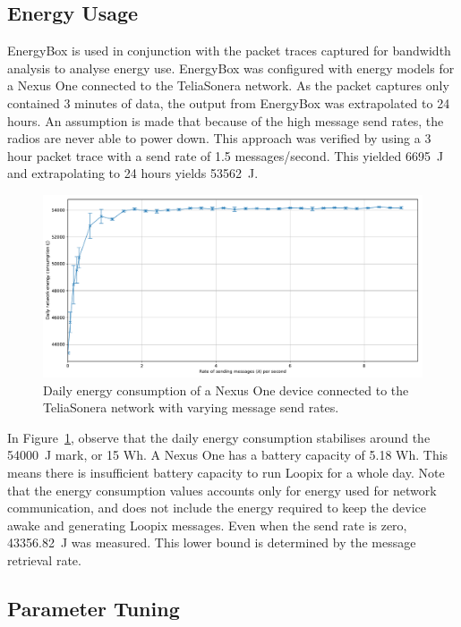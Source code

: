 \documentclass[final,dissertation.tex]{subfiles}
\begin{document}
\subsection{Energy Usage}

EnergyBox \cite{vergara2014energybox} is used in conjunction with the packet traces captured for bandwidth analysis to analyse energy use. EnergyBox was configured with energy models for a Nexus One connected to the TeliaSonera network. As the packet captures only contained 3 minutes of data, the output from EnergyBox was extrapolated to 24 hours. An assumption is made that because of the high message send rates, the radios are never able to power down. This approach was verified by using a 3 hour packet trace with a send rate of 1.5 messages/second. This yielded \SI{6695}{\joule} and extrapolating to 24 hours yields \SI{53562}{\joule}.

\begin{figure}[h]
	\includegraphics[width=\linewidth]{../figs/energy_use_2}
	\caption{Daily energy consumption of a Nexus One device connected to the TeliaSonera network with varying message send rates.}
	\label{fig:energy_use_2}
\end{figure}

In Figure~\ref{fig:energy_use_2}, observe that the daily energy consumption stabilises around the \SI{54000}{\joule} mark, or 15 Wh. A Nexus One has a battery capacity of 5.18 Wh. This means there is insufficient battery capacity to run Loopix for a whole day. Note that the energy consumption values accounts only for energy used for network communication, and does not include the energy required to keep the device awake and generating Loopix messages. Even when the send rate is zero, \SI{43356.82}{\joule} was measured. This lower bound is determined by the message retrieval rate.

\subsection{Parameter Tuning} \label{sec:tuning}
\end{document}
